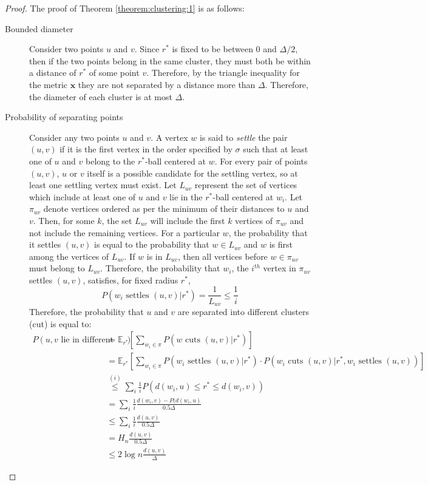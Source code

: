 {\begin{proof}
The proof of Theorem \ref{theorem:clustering:1} is as follows:
\begin{description}
	\item[Bounded diameter] Consider two points $u$ and $v$. Since $r^*$ is fixed to be between $0$ and $\Delta / 2$, then if the two points belong in the same cluster, they must both be within a distance of $r^*$ of some point $v$. Therefore, by the triangle inequality for the metric $\mathbf{x}$ they are not separated by a distance more than $\Delta$. Therefore, the diameter of each cluster is at most $\Delta$.
	\item[Probability of separating points] Consider any two points $u$ and $v$. A vertex $w$ is said to \textit{settle} the pair $(u,v)$ if it is the first vertex in the order specified by $\sigma$ such that at least one of $u$ and $v$ belong to the $r^*$-ball centered at $w$. For every pair of points $(u,v)$, $u$ or $v$ itself is a possible candidate for the settling vertex, so at least one settling vertex must exist.
	Let $L_{uv}$ represent the set of vertices which include at least one of $u$ and $v$ lie in the $r^*$-ball centered at $w_i$. Let $\pi_{uv}$ denote vertices ordered as per the minimum of their distances to $u$ and $v$. Then, for some $k$, the set $L_{uv}$ will include the first $k$ vertices of $\pi_{uv}$ and not include the remaining vertices. For a particular $w$, the probability that it settles $(u,v)$ is equal to the probability that $w \in L_{uv}$ and $w$ is first among the vertices of $L_{uv}$. If $w$ is in $L_{uv}$, then all vertices before $w \in \pi_{uv}$ must belong to $L_{uv}$. Therefore, the probability that $w_i$, the $i^{th}$ vertex in $\pi_{uv}$ settles $(u,v)$, satisfies, for fixed radius $r^*$,
	\begin{equation*}
		P (w_i \text{ settles } (u,v) | r^*) = \frac{1}{L_{uv}} \le \frac{1}{i}
	\end{equation*}
	Therefore, the probability that $u$ and $v$ are separated into different clusters (cut) is equal to:
	\begin{align}
		P (u,v \text{ lie in different clusters}) &= \mathbb{E}_{r^*} \left[\sum_{w_i \in \pi} P (w \text{ cuts } (u,v) | r^*) \right] \\
		&= \mathbb{E}_{r^*} \left[\sum_{w_i \in \pi} P (w_i \text{ settles } (u,v) | r^*) \cdot P (w_i \text{ cuts } (u,v) | r^*, w_i \text{ settles } (u,v)) \right] \\
		&\overset{(i)}{\le} \sum_i \frac{1}{i} P( d(w_i,u) \le r^* \le d(w_i,v) ) \label{ineq:1}\\
		&= \sum_i \frac{1}{i} \frac{d(w_i,v) - P( d(w_i,u)}{0.5 \Delta} \\
		&\le \sum_i \frac{1}{i} \frac{d(u,v)}{0.5 \Delta} \\
		&= H_n  \frac{d(u,v)}{0.5 \Delta} \\
		&\le 2 \log{n} \frac{d(u,v)}{\Delta}
	\end{align}
\end{description}
\end{proof}}

